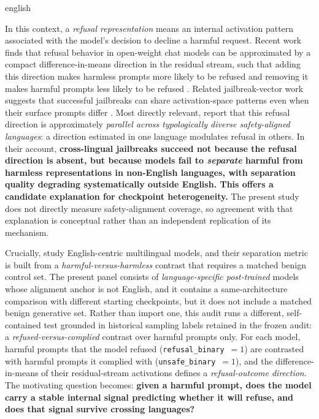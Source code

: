 \begin{otherlanguage*}{english}


In this context, a \emph{refusal representation} means an internal activation pattern associated with the model's decision to decline a harmful request. Recent work finds that refusal behavior in open-weight chat models can be approximated by a compact difference-in-means direction in the residual stream, such that adding this direction makes harmless prompts more likely to be refused and removing it makes harmful prompts less likely to be refused \cite{arditiRefusalLanguageModels2024}. Related jailbreak-vector work suggests that successful jailbreaks can share activation-space patterns even when their surface prompts differ \cite{ballUnderstandingJailbreakSuccess2024}. Most directly relevant, \textcite{wangRefusalDirectionUniversal2025} report that this refusal direction is approximately \emph{parallel across typologically diverse safety-aligned languages}: a direction estimated in one language modulates refusal in others. In their account, \textbf{cross-lingual jailbreaks succeed not because the refusal direction is absent, but because models fail to \emph{separate} harmful from harmless representations in non-English languages, with separation quality degrading systematically outside English. This offers a candidate explanation for checkpoint heterogeneity.} The present study does not directly measure safety-alignment coverage, so agreement with that explanation is conceptual rather than an independent replication of its mechanism.

Crucially, \textcite{wangRefusalDirectionUniversal2025} study English-centric multilingual models, and their separation metric is built from a \emph{harmful-versus-harmless} contrast that requires a matched benign control set. The present panel consists of \emph{language-specific post-trained} models whose alignment anchor is not English, and it contains a same-architecture comparison with different starting checkpoints, but it does not include a matched benign generative set. Rather than import one, this audit runs a different, self-contained test grounded in historical sampling labels retained in the frozen audit: a \emph{refused-versus-complied} contrast over harmful prompts only. For each model, harmful prompts that the model refused (\texttt{refusal\_binary}~$=1$) are contrasted with harmful prompts it complied with (\texttt{unsafe\_binary}~$=1$), and the difference-in-means of their residual-stream activations defines a \emph{refusal-outcome direction}. The motivating question becomes: \textbf{given a harmful prompt, does the model carry a stable internal signal predicting whether it will refuse, and does that signal survive crossing languages?}


\end{otherlanguage*}
